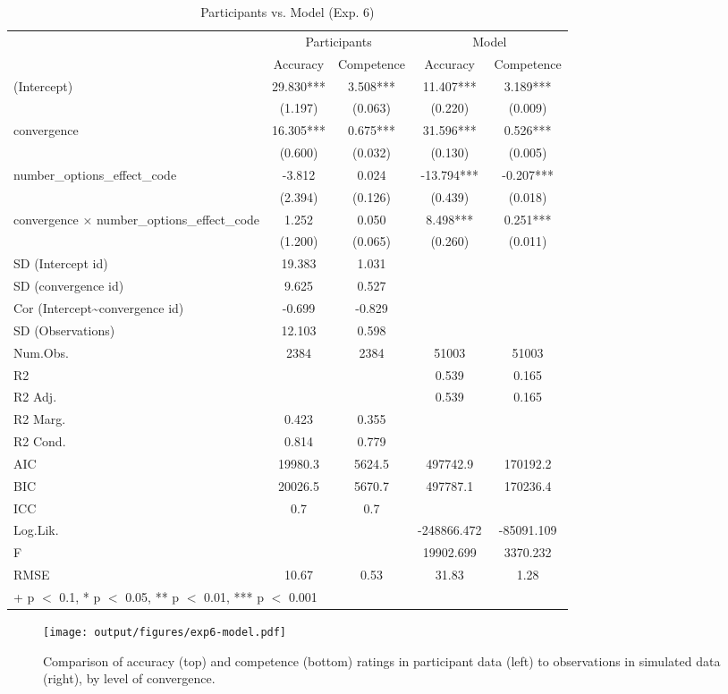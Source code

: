 \documentclass[
  doc,floatsintext]{apa6}
\begin{document}
\begin{table}

\caption{\label{tab:unnamed-chunk-101}Participants vs. Model (Exp. 6)}
\centering
\begin{tabular}[t]{lcccc}
\toprule
\multicolumn{1}{c}{ } & \multicolumn{2}{c}{Participants} & \multicolumn{2}{c}{Model} \\
\cmidrule(l{3pt}r{3pt}){2-3} \cmidrule(l{3pt}r{3pt}){4-5}
  & Accuracy & Competence & Accuracy  & Competence \\
\midrule
(Intercept) & 29.830*** & 3.508*** & 11.407*** & 3.189***\\
 & (1.197) & (0.063) & (0.220) & (0.009)\\
convergence & 16.305*** & 0.675*** & 31.596*** & 0.526***\\
 & (0.600) & (0.032) & (0.130) & (0.005)\\
number\_options\_effect\_code & -3.812 & 0.024 & -13.794*** & -0.207***\\
 & (2.394) & (0.126) & (0.439) & (0.018)\\
convergence × number\_options\_effect\_code & 1.252 & 0.050 & 8.498*** & 0.251***\\
 & (1.200) & (0.065) & (0.260) & (0.011)\\
SD (Intercept id) & 19.383 & 1.031 &  & \\
SD (convergence id) & 9.625 & 0.527 &  & \\
Cor (Intercept\textasciitilde{}convergence id) & -0.699 & -0.829 &  & \\
SD (Observations) & 12.103 & 0.598 &  & \\
\midrule
Num.Obs. & 2384 & 2384 & 51003 & 51003\\
R2 &  &  & 0.539 & 0.165\\
R2 Adj. &  &  & 0.539 & 0.165\\
R2 Marg. & 0.423 & 0.355 &  & \\
R2 Cond. & 0.814 & 0.779 &  & \\
AIC & 19980.3 & 5624.5 & 497742.9 & 170192.2\\
BIC & 20026.5 & 5670.7 & 497787.1 & 170236.4\\
ICC & 0.7 & 0.7 &  & \\
Log.Lik. &  &  & -248866.472 & -85091.109\\
F &  &  & 19902.699 & 3370.232\\
RMSE & 10.67 & 0.53 & 31.83 & 1.28\\
\bottomrule
\multicolumn{5}{l}{\rule{0pt}{1em}+ p $<$ 0.1, * p $<$ 0.05, ** p $<$ 0.01, *** p $<$ 0.001}\\
\end{tabular}
\end{table}



\begin{figure}
\centering
\texttt{[image: output/figures/exp6-model.pdf]}
\caption{\label{fig:exp6-model}Comparison of accuracy (top) and competence (bottom) ratings in participant data (left) to observations in simulated data (right), by level of convergence.}
\end{figure}
\end{document}
